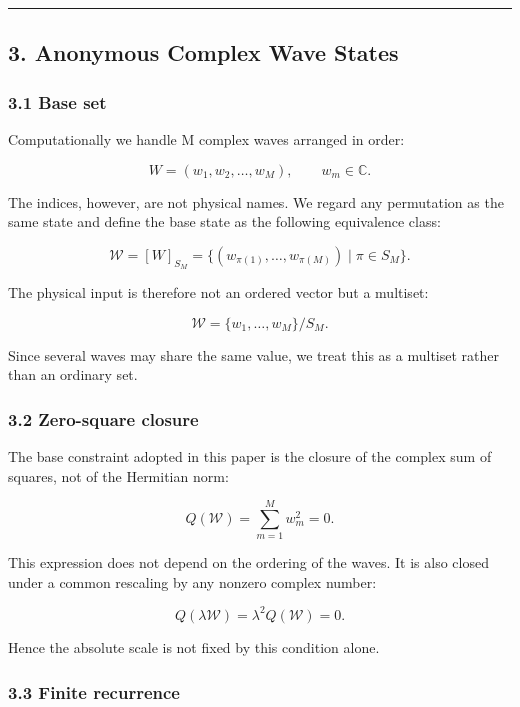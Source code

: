 \documentclass[
  a4paper,
]{article}
\begin{document}
\begin{center}\rule{0.5\linewidth}{0.5pt}\end{center}

\subsection{3. Anonymous Complex Wave
States}\label{anonymous-complex-wave-states}

\subsubsection{3.1 Base set}\label{base-set}

Computationally we handle M complex waves arranged in order:

\[
W=(w_1,w_2,\ldots,w_M),
\qquad
w_m\in\mathbb C.
\]

The indices, however, are not physical names. We regard any permutation
as the same state and define the base state as the following equivalence
class:

\[
\mathcal W
=
[W]_{S_M}
=
\{(w_{\pi(1)},\ldots,w_{\pi(M)})\mid \pi\in S_M\}.
\]

The physical input is therefore not an ordered vector but a multiset:

\[
\mathcal W
=
\{w_1,\ldots,w_M\}/S_M.
\]

Since several waves may share the same value, we treat this as a
multiset rather than an ordinary set.

\subsubsection{3.2 Zero-square closure}\label{zero-square-closure}

The base constraint adopted in this paper is the closure of the complex
sum of squares, not of the Hermitian norm:

\[
Q(\mathcal W)
=
\sum_{m=1}^{M}w_m^2
=0.
\]

This expression does not depend on the ordering of the waves. It is also
closed under a common rescaling by any nonzero complex number:

\[
Q(\lambda\mathcal W)
=
\lambda^2Q(\mathcal W)
=0.
\]

Hence the absolute scale is not fixed by this condition alone.

\subsubsection{3.3 Finite recurrence}\label{finite-recurrence}
\end{document}
